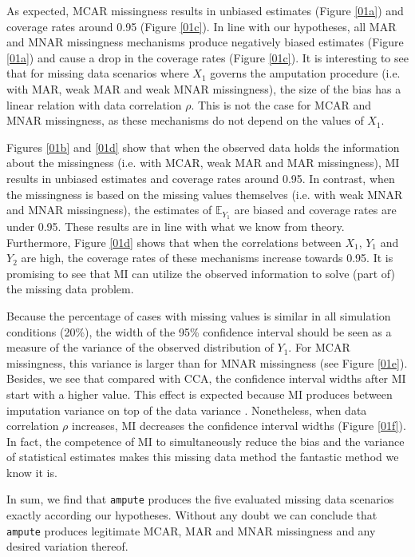 \documentclass[11pt,a4paper]{article}
\newcommand{\code}[1]{\texttt{#1}}
\begin{document}
As expected, MCAR missingness results in unbiased estimates (Figure \ref{01a}) and coverage rates around 0.95 (Figure \ref{01c}). In line with our hypotheses, all MAR and MNAR missingness mechanisms produce negatively biased estimates (Figure \ref{01a}) and cause a drop in the coverage rates (Figure \ref{01c}). It is interesting to see that for missing data scenarios where $X_1$ governs the amputation procedure (i.e. with MAR, weak MAR and weak MNAR missingness), the size of the bias has a linear relation with data correlation $\rho$. This is not the case for MCAR and MNAR missingness, as these mechanisms do not depend on the values of $X_1$. 

Figures \ref{01b} and \ref{01d} show that when the observed data holds the information about the missingness (i.e. with MCAR, weak MAR and MAR missingness), MI results in unbiased estimates and coverage rates around 0.95. In contrast, when the missingness is based on the missing values themselves (i.e. with weak MNAR and MNAR missingness), the estimates of $\mathbb{E}_{Y_1}$ are biased and coverage rates are under 0.95. These results are in line with what we know from theory. Furthermore, Figure \ref{01d} shows that when the correlations between $X_1$, $Y_1$ and $Y_2$ are high, the coverage rates of these mechanisms increase towards 0.95. It is promising to see that MI can utilize the observed information to solve (part of) the missing data problem. 

Because the percentage of cases with missing values is similar in all simulation conditions (20\%), the width of the 95\% confidence interval should be seen as a measure of the variance of the observed distribution of $Y_1$. For MCAR missingness, this variance is larger than for MNAR missingness (see Figure \ref{01e}). Besides, we see that compared with CCA, the confidence interval widths after MI start with a higher value. This effect is expected because MI produces between imputation variance on top of the data variance \citep{Rubin1987}. Nonetheless, when data correlation $\rho$ increases, MI decreases the confidence interval widths (Figure \ref{01f}). In fact, the competence of MI to simultaneously reduce the bias and the variance of statistical estimates makes this missing data method the fantastic method we know it is. 

In sum, we find that \code{ampute} produces the five evaluated missing data scenarios exactly according our hypotheses. Without any doubt we can conclude that \code{ampute} produces legitimate MCAR, MAR and  MNAR missingness and any desired variation thereof. 
\end{document}

